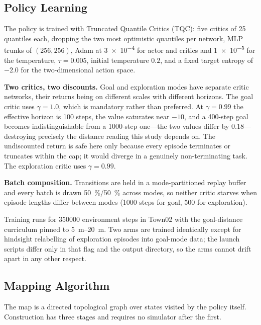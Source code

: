 \subsection{Policy Learning}
\label{sec:setup:learning}

The policy is trained with Truncated Quantile Critics (TQC): five critics of
\num{25} quantiles each, dropping the two most optimistic quantiles per network,
MLP trunks of $(256, 256)$, Adam at \num{3e-4} for actor and critics and
\num{1e-5} for the temperature, $\tau = 0.005$, initial temperature $0.2$, and a
fixed target entropy of $-2.0$ for the two-dimensional action space.

\textbf{Two critics, two discounts.} Goal and exploration modes have separate
critic networks, their returns being on different scales with different
horizons. The goal critic uses $\gamma = 1.0$, which is mandatory rather than
preferred. At $\gamma = 0.99$ the effective horizon is \num{100} steps, the
value saturates near $-10$, and a \num{400}-step goal becomes indistinguishable
from a \num{1000}-step one---the two values differ by \num{0.18}---destroying
precisely the distance reading this study depends on. The undiscounted return is
safe here only because every episode terminates or truncates within the cap; it
would diverge in a genuinely non-terminating task. The exploration critic uses
$\gamma = 0.99$.

\textbf{Batch composition.} Transitions are held in a mode-partitioned replay
buffer and every batch is drawn \SI{50}{\percent}/\SI{50}{\percent} across
modes, so neither critic starves when episode lengths differ between modes
(\num{1000} steps for goal, \num{500} for exploration).

Training runs for \num{350000} environment steps in Town02 with the
goal-distance curriculum pinned to \SI{5}{\meter}--\SI{20}{\meter}. Two arms are
trained identically except for hindsight relabelling of exploration episodes
into goal-mode data; the launch scripts differ only in that flag and the output
directory, so the arms cannot drift apart in any other respect.

\subsection{Mapping Algorithm}
\label{sec:setup:mapping}

The map is a directed topological graph over states visited by the policy
itself. Construction has three stages and requires no simulator after the first.


